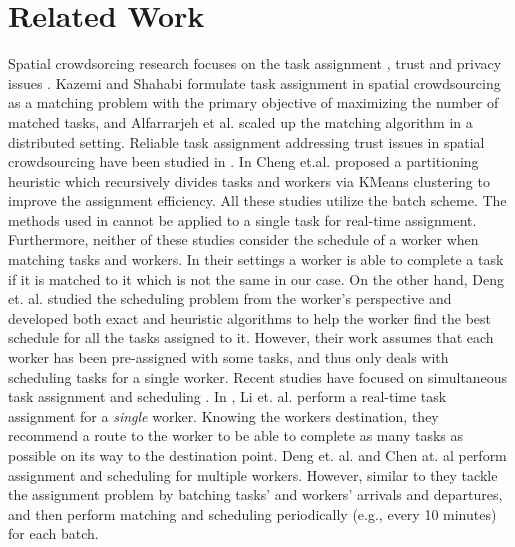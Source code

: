 \section{Related Work}
\label{sec:related}

Spatial crowdsorcing research focuses on the task assignment \cite{Kazemi12,Alfarrarjeh15,Cheng15,Deng13,Li15,Chen15,Deng15}, trust \cite{Kazemi13,Cheng15} and privacy issues \cite{To14}. Kazemi and Shahabi \cite{Kazemi12} formulate task assignment in spatial crowdsourcing as a matching problem with the primary objective of maximizing the number of matched tasks, and Alfarrarjeh et al. \cite{Alfarrarjeh15} scaled up the matching algorithm in a distributed setting. Reliable task assignment addressing trust issues in spatial crowdsourcing have been studied in \cite{Kazemi13,Cheng15}. In \cite{Cheng15} Cheng et.al. proposed a partitioning heuristic which recursively divides tasks and workers via KMeans clustering to improve the assignment efficiency. All these studies utilize the batch scheme. The methods used in \cite{Kazemi12,Cheng15,Alfarrarjeh15} cannot be applied to a single task for real-time assignment. Furthermore, neither of these studies consider the schedule of a worker when matching tasks and workers. In their settings a worker is able to complete a task if it is matched to it which is not the same in our case. On the other hand, Deng et. al. \cite{Deng13} studied the scheduling problem from the worker's perspective and developed both exact and heuristic algorithms to help the worker find the best schedule for all the tasks assigned to it. However, their work assumes that each worker has been pre-assigned with some tasks, and thus only deals with scheduling tasks for a single worker. Recent studies have focused on simultaneous task assignment and scheduling \cite{Li15,Deng15,Cheng15}. In \cite{Li15}, Li et. al. perform a real-time task assignment for a \emph{single} worker. Knowing the workers destination, they recommend a route to the worker to be able to complete as many tasks as possible on its way to the destination point. Deng et. al. \cite{Deng15} and Chen at. al \cite{Chen15} perform assignment and scheduling for multiple workers. However, similar to \cite{Kazemi12,Cheng15,Alfarrarjeh15} they tackle the assignment problem by batching tasks' and workers' arrivals and departures, and then perform matching and scheduling periodically (e.g., every 10 minutes) for each batch.

